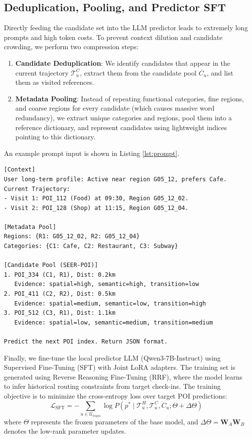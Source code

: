 \documentclass[10pt,twocolumn]{article}
\begin{document}
\subsection{Deduplication, Pooling, and Predictor SFT}
Directly feeding the candidate set into the LLM predictor leads to extremely long prompts and high token costs. To prevent context dilution and candidate crowding, we perform two compression steps:
\begin{enumerate}
    \item \textbf{Candidate Deduplication}: We identify candidates that appear in the current trajectory $\mathcal{T}^C_u$, extract them from the candidate pool $C_u$, and list them as visited references.
    \item \textbf{Metadata Pooling}: Instead of repeating functional categories, fine regions, and coarse regions for every candidate (which causes massive word redundancy), we extract unique categories and regions, pool them into a reference dictionary, and represent candidates using lightweight indices pointing to this dictionary.
\end{enumerate}

An example prompt input is shown in Listing \ref{lst:prompt}.

\begin{lstlisting}[caption={Compact Predictor Prompt Layout},label={lst:prompt}]
[Context]
User long-term profile: Active near region G05_12, prefers Cafe.
Current Trajectory:
- Visit 1: POI_112 (Food) at 09:30, Region G05_12_02.
- Visit 2: POI_128 (Shop) at 11:15, Region G05_12_04.

[Metadata Pool]
Regions: {R1: G05_12_02, R2: G05_12_04}
Categories: {C1: Cafe, C2: Restaurant, C3: Subway}

[Candidate Pool (SEER-POI)]
1. POI_334 (C1, R1), Dist: 0.2km
   Evidence: spatial=high, semantic=high, transition=low
2. POI_411 (C2, R2), Dist: 0.5km
   Evidence: spatial=medium, semantic=low, transition=high
3. POI_512 (C3, R1), Dist: 1.1km
   Evidence: spatial=low, semantic=medium, transition=medium

Predict the next POI index. Return JSON format.
\end{lstlisting}

Finally, we fine-tune the local predictor LLM (Qwen3-7B-Instruct) using Supervised Fine-Tuning (SFT) with Joint LoRA adapters. The training set is generated using Reverse Reasoning Fine-Tuning (RRF), where the model learns to infer historical routing constraints from target check-ins. The training objective is to minimize the cross-entropy loss over target POI predictions:
\begin{equation}
    \mathcal{L}_{\mathrm{SFT}} = - \sum_{u \in \mathcal{U}_{train}} \log P(p^* \mid \mathcal{T}^H_u, \mathcal{T}^C_u, C_u; \Theta + \Delta \Theta)
\end{equation}
where $\Theta$ represents the frozen parameters of the base model, and $\Delta \Theta = \mathbf{W}_A \mathbf{W}_B$ denotes the low-rank parameter updates.
\end{document}
